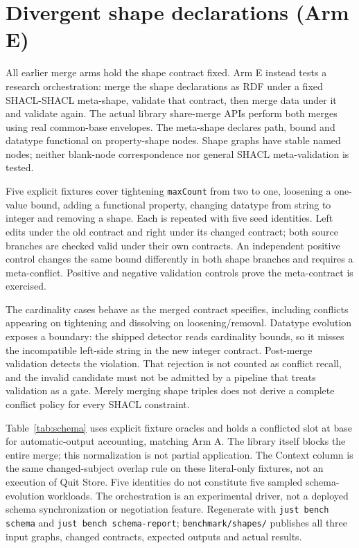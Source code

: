 \section{Divergent shape declarations (Arm E)}
\label{sec:schema}

All earlier merge arms hold the shape contract fixed. Arm E instead tests a
research orchestration: merge the shape declarations as RDF under a fixed
SHACL-SHACL meta-shape, validate that contract, then merge data under it and
validate again. The actual library share-merge APIs perform both merges using
real common-base envelopes. The meta-shape declares path, bound and datatype
functional on property-shape nodes. Shape graphs have stable named nodes;
neither blank-node correspondence nor general SHACL meta-validation is tested.

Five explicit fixtures cover tightening \texttt{maxCount} from two to one,
loosening a one-value bound, adding a functional property, changing datatype
from string to integer and removing a shape. Each is repeated with five seed
identities. Left edits under the old contract and right under its changed
contract; both source branches are checked valid under their own contracts.
An independent positive control changes the same bound differently in both
shape branches and requires a meta-conflict. Positive and negative validation
controls prove the meta-contract is exercised.



The cardinality cases behave as the merged contract specifies, including
conflicts appearing on tightening and dissolving on loosening/removal. Datatype
evolution exposes a boundary: the shipped detector reads cardinality bounds,
so it misses the incompatible left-side string in the new integer contract.
Post-merge validation detects the violation. That rejection is not counted as
conflict recall, and the invalid candidate must not be admitted by a pipeline
that treats validation as a gate. Merely merging shape triples does not derive
a complete conflict policy for every SHACL constraint.

Table~\ref{tab:schema} uses explicit fixture oracles and holds a conflicted slot
at base for automatic-output accounting, matching Arm A. The library itself
blocks the entire merge; this normalization is not partial application. The
Context column is the same changed-subject overlap rule on these literal-only
fixtures, not an execution of Quit Store. Five identities do not constitute
five sampled schema-evolution workloads. The orchestration is an experimental
driver, not a deployed schema synchronization or negotiation feature.
Regenerate with \texttt{just bench schema} and \texttt{just bench schema-report};
\texttt{benchmark/shapes/} publishes all three input graphs, changed contracts,
expected outputs and actual results.
